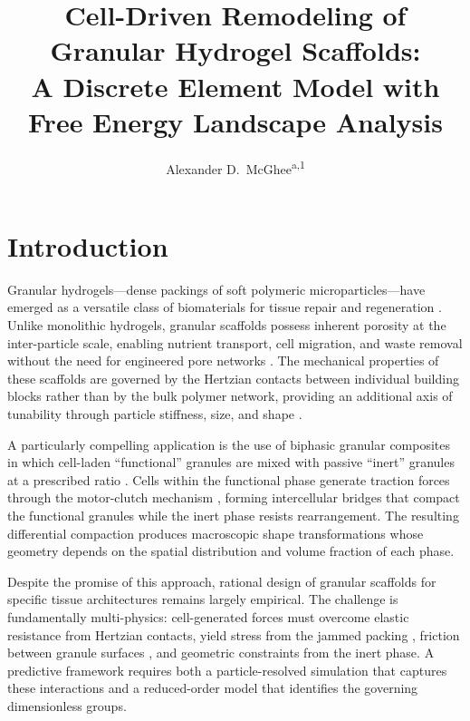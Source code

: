 \documentclass[9pt,twocolumn,twoside]{pnas-new}
\title{Cell-Driven Remodeling of Granular Hydrogel Scaffolds:\\
A Discrete Element Model with Free Energy Landscape Analysis}
\author{Alexander D.\ McGhee\textsuperscript{a,1}}
\affil[a]{Department of Mechanical Science and Engineering, University of Illinois at Urbana-Champaign, Urbana, IL 61801}
\begin{document}
\maketitle
\thispagestyle{firststyle}

\section*{Introduction}

Granular hydrogels---dense packings of soft polymeric microparticles---have
emerged as a versatile class of biomaterials for tissue repair and
regeneration \cite{Riley2019}. Unlike monolithic hydrogels, granular
scaffolds possess inherent porosity at the inter-particle scale, enabling
nutrient transport, cell migration, and waste removal without the need for
engineered pore networks \cite{Hollister2005}. The mechanical properties of
these scaffolds are governed by the Hertzian contacts between individual
building blocks rather than by the bulk polymer network, providing an
additional axis of tunability through particle stiffness, size, and shape
\cite{Cai2022}.

A particularly compelling application is the use of biphasic granular
composites in which cell-laden ``functional'' granules are mixed with passive
``inert'' granules at a prescribed ratio \cite{DiCaprio2025}. Cells within
the functional phase generate traction forces through the motor-clutch
mechanism \cite{Chan2008,Bangasser2013}, forming intercellular bridges that
compact the functional granules while the inert phase resists rearrangement.
The resulting differential compaction produces macroscopic shape
transformations whose geometry depends on the spatial distribution and volume
fraction of each phase.

Despite the promise of this approach, rational design of granular scaffolds
for specific tissue architectures remains largely empirical. The challenge is
fundamentally multi-physics: cell-generated forces must overcome elastic
resistance from Hertzian contacts, yield stress from the jammed packing
\cite{OHern2003,vanHecke2010}, friction between granule surfaces
\cite{Gong2006,Pitenis2014}, and geometric constraints from the inert phase.
A predictive framework requires both a particle-resolved simulation that
captures these interactions and a reduced-order model that identifies the
governing dimensionless groups.
\end{document}
